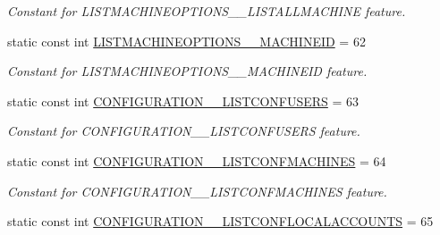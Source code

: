 \begin{DoxyCompactItemize}
\begin{DoxyCompactList}\small\item\em Constant for LISTMACHINEOPTIONS\_\-\_\-LISTALLMACHINE feature. \item\end{DoxyCompactList}\item 
\hypertarget{classUMS__Data_1_1UMS__DataPackage_ab50bd50f83d664639667349335192913}{
static const int \hyperlink{classUMS__Data_1_1UMS__DataPackage_ab50bd50f83d664639667349335192913}{LISTMACHINEOPTIONS\_\-\_\-MACHINEID} = 62}
\label{classUMS__Data_1_1UMS__DataPackage_ab50bd50f83d664639667349335192913}

\begin{DoxyCompactList}\small\item\em Constant for LISTMACHINEOPTIONS\_\-\_\-MACHINEID feature. \item\end{DoxyCompactList}\item 
\hypertarget{classUMS__Data_1_1UMS__DataPackage_a77795687c70e456ad26df5e1fb988fa3}{
static const int \hyperlink{classUMS__Data_1_1UMS__DataPackage_a77795687c70e456ad26df5e1fb988fa3}{CONFIGURATION\_\-\_\-LISTCONFUSERS} = 63}
\label{classUMS__Data_1_1UMS__DataPackage_a77795687c70e456ad26df5e1fb988fa3}

\begin{DoxyCompactList}\small\item\em Constant for CONFIGURATION\_\-\_\-LISTCONFUSERS feature. \item\end{DoxyCompactList}\item 
\hypertarget{classUMS__Data_1_1UMS__DataPackage_ac8e35fe610fd6a5ddea75675761d17fb}{
static const int \hyperlink{classUMS__Data_1_1UMS__DataPackage_ac8e35fe610fd6a5ddea75675761d17fb}{CONFIGURATION\_\-\_\-LISTCONFMACHINES} = 64}
\label{classUMS__Data_1_1UMS__DataPackage_ac8e35fe610fd6a5ddea75675761d17fb}

\begin{DoxyCompactList}\small\item\em Constant for CONFIGURATION\_\-\_\-LISTCONFMACHINES feature. \item\end{DoxyCompactList}\item 
\hypertarget{classUMS__Data_1_1UMS__DataPackage_a2b9b5891a0c2bca529ba7c590fdcdb4f}{
static const int \hyperlink{classUMS__Data_1_1UMS__DataPackage_a2b9b5891a0c2bca529ba7c590fdcdb4f}{CONFIGURATION\_\-\_\-LISTCONFLOCALACCOUNTS} = 65}
\label{classUMS__Data_1_1UMS__DataPackage_a2b9b5891a0c2bca529ba7c590fdcdb4f}


\end{DoxyCompactItemize}
